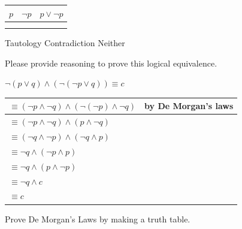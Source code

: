 \documentclass[letterpaper]{exam}
\begin{document}
\begin{questions}
        \begin{tabular}{|c|c|c|}
            \hline
            $p$ & $\neg p$ & $p \lor \neg p$\\ \hline
             &  &  \\ \hline
             &  &  \\ \hline
        \end{tabular}

        \begin{checkboxes}
            \choice Tautology
            \choice Contradiction
            \choice Neither
        \end{checkboxes}



        
        \question Please provide reasoning to prove this logical equivalence.

        $\neg (p \lor q)\land (\neg (\neg p \lor q)) \equiv c$

        
        \begin{tabular}{|l|c|}
            \hline
            $\equiv (\neg p \land \neg q)\land(\neg(\neg p)\land \neg q)$ & by De Morgan’s laws\hspace{7cm} \\ \hline
            $\equiv (\neg p \land \neg q)\land(p \land \neg q)$ &  \\ \hline
            $\equiv (\neg q \land \neg p) \land (\neg q \land p)$ &  \\ \hline
            $\equiv \neg q \land (\neg p \land p)$ &  \\ \hline
            $\equiv \neg q \land (p \land \neg p)$ &  \\ \hline
            $\equiv \neg q \land c$ &  \\ \hline
            $\equiv c$ & \\ \hline
        \end{tabular}




        \question Prove De Morgan's Laws by making a truth table.

\end{questions}
\end{document}
